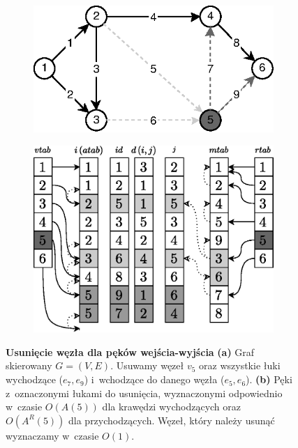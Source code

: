 \begin{figure}[!htbp]
	\centering
	\begin{subfigure}[b]{0.55\textwidth}
		\includegraphics[width=\textwidth]{Chapter_I/7/1_7a.eps}
		\caption{}
	\end{subfigure}%
	\qquad
	\begin{subfigure}[b]{0.4\textwidth}
		\includegraphics[width=\textwidth]{Chapter_I/7/1_7b.eps}
		\caption{}
	\end{subfigure}
	\caption{\textbf{Usunięcie węzła dla pęków wejścia-wyjścia} \textbf{(a)} Graf skierowany $G = \left( V, E \right)$. Usuwamy węzeł $v_{5}$ oraz wszystkie łuki wychodzące ($e_{7}, e_{9}$) i~wchodzące do danego węzła ($e_{5}, e_{6}$). \textbf{(b)} Pęki z~oznaczonymi łukami do usunięcia, wyznaczonymi odpowiednio w~czasie $ O \left( A \left( 5 \right) \right)$ dla krawędzi wychodzących oraz $ O \left( A^{R} \left( 5 \right) \right)$ dla przychodzących. Węzeł, który należy usunąć wyznaczamy w~czasie $ O \left( 1 \right)$. }
	\label{fig:forwardReverseStarRepresentationDeleteNode}
\end{figure}

